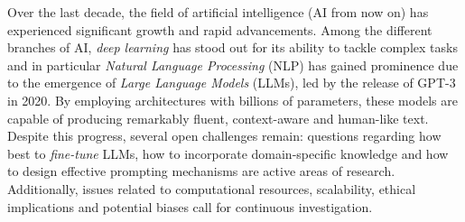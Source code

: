 


Over the last decade, the field of artificial intelligence (AI from now on) has experienced significant growth and rapid advancements. Among the different branches of AI, \textit{deep learning} has stood out for its ability to tackle complex tasks and in particular \textit{Natural Language Processing} (NLP) has gained prominence due to the emergence of \textit{Large Language Models} (LLMs), led by the release of GPT-3 in 2020. \cite{brown2020language} By employing architectures with billions of parameters, these models are capable of producing remarkably fluent, context-aware and human-like text. Despite this progress, several open challenges remain: questions regarding how best to \textit{fine-tune} LLMs, how to incorporate domain-specific knowledge and how to design effective prompting mechanisms are active areas of research. Additionally, issues related to computational resources, scalability, ethical implications and potential biases call for continuous investigation.

